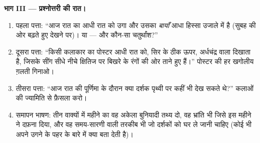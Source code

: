 \begin{problem}
\medskip\noindent\textbf{भाग III --- प्रश्नोत्तरी की रात।}
\begin{enumerate}[resume]
  \item पहला पत्ता: ``आज रात का  आधी रात को उगा और उसका
        \emph{बायाँ} आधा हिस्सा उजाले में है (सुबह की ओर बढ़ते हुए
        देखने पर)।  या  --- और कौन-सा
        चतुर्थांश?''
  \item दूसरा पत्ता: ``किसी कलाकार का पोस्टर आधी रात को, सिर के ठीक
        ऊपर, अर्धचंद्र वाला  दिखाता है, जिसके सींग सीधे नीचे
        क्षितिज पर बिखरे  के रंगों की ओर ताने हुए हैं।''
        पोस्टर की हर खगोलीय ग़लती गिनाओ।
  \item तीसरा पत्ता: ``आज रात की पूर्णिमा के दौरान क्या दर्शक पृथ्वी
        पर कहीं  भी देख सकते थे?'' कलाओं की ज्यामिति से
        फ़ैसला करो।
  \item समापन भाषण: तीन वाक्यों में महीने का वह अकेला बुनियादी तथ्य
        दो, वह भ्रांति भी जिसे इस महीने ने दफ़ना दिया, और वह
        समय-सारणी वाली तरकीब भी जो दर्शकों को घर ले जानी चाहिए (कोई
        भी  अपने उगने के पहर के बारे में क्या बता देती है)।
\end{enumerate}
\end{problem}
